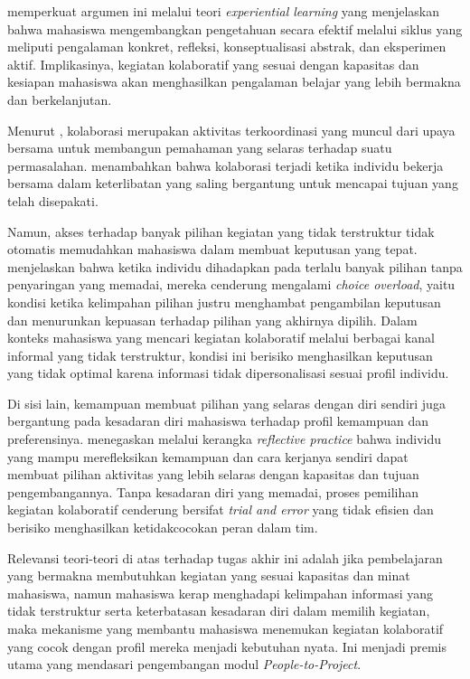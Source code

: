 \textcite{kolb2014} memperkuat argumen ini melalui teori \emph{experiential learning} yang menjelaskan bahwa mahasiswa mengembangkan pengetahuan secara efektif melalui siklus yang meliputi pengalaman konkret, refleksi, konseptualisasi abstrak, dan eksperimen aktif. Implikasinya, kegiatan kolaboratif yang sesuai dengan kapasitas dan kesiapan mahasiswa akan menghasilkan pengalaman belajar yang lebih bermakna dan berkelanjutan.

Menurut \textcite{roschelle1995}, kolaborasi merupakan aktivitas terkoordinasi yang muncul dari upaya bersama untuk membangun pemahaman yang selaras terhadap suatu permasalahan. \textcite{dillenbourg1999} menambahkan bahwa kolaborasi terjadi ketika individu bekerja bersama dalam keterlibatan yang saling bergantung untuk mencapai tujuan yang telah disepakati.

Namun, akses terhadap banyak pilihan kegiatan yang tidak terstruktur tidak otomatis memudahkan mahasiswa dalam membuat keputusan yang tepat. \textcite{schwartz2004} menjelaskan bahwa ketika individu dihadapkan pada terlalu banyak pilihan tanpa penyaringan yang memadai, mereka cenderung mengalami \emph{choice overload}, yaitu kondisi ketika kelimpahan pilihan justru menghambat pengambilan keputusan dan menurunkan kepuasan terhadap pilihan yang akhirnya dipilih. Dalam konteks mahasiswa yang mencari kegiatan kolaboratif melalui berbagai kanal informal yang tidak terstruktur, kondisi ini berisiko menghasilkan keputusan yang tidak optimal karena informasi tidak dipersonalisasi sesuai profil individu.

Di sisi lain, kemampuan membuat pilihan yang selaras dengan diri sendiri juga bergantung pada kesadaran diri mahasiswa terhadap profil kemampuan dan preferensinya. \textcite{schon1987} menegaskan melalui kerangka \emph{reflective practice} bahwa individu yang mampu merefleksikan kemampuan dan cara kerjanya sendiri dapat membuat pilihan aktivitas yang lebih selaras dengan kapasitas dan tujuan pengembangannya. Tanpa kesadaran diri yang memadai, proses pemilihan kegiatan kolaboratif cenderung bersifat \emph{trial and error} yang tidak efisien dan berisiko menghasilkan ketidakcocokan peran dalam tim.

Relevansi teori-teori di atas terhadap tugas akhir ini adalah jika pembelajaran yang bermakna membutuhkan kegiatan yang sesuai kapasitas dan minat mahasiswa, namun mahasiswa kerap menghadapi kelimpahan informasi yang tidak terstruktur serta keterbatasan kesadaran diri dalam memilih kegiatan, maka mekanisme yang membantu mahasiswa menemukan kegiatan kolaboratif yang cocok dengan profil mereka menjadi kebutuhan nyata. Ini menjadi premis utama yang mendasari pengembangan modul \emph{People-to-Project}.

